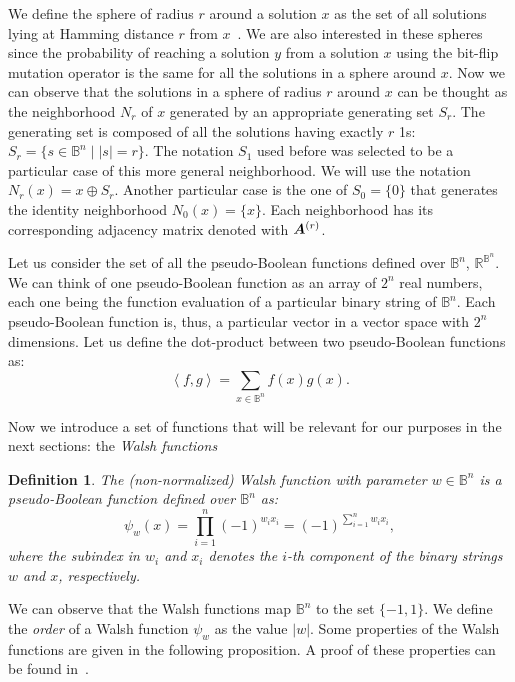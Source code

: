 \documentclass{article}
\newtheorem{definition}{Definition}
\def\vec#1{\mathchoice{\mbox{\boldmath$\displaystyle#1$}}
  {\mbox{\boldmath$\textstyle#1$}}
  {\mbox{\boldmath$\scriptstyle#1$}}
  {\mbox{\boldmath$\scriptscriptstyle#1$}}}
\newcommand{\Bo}[0]{\mathbb{B}}
\newcommand{\Real}[0]{\mathbb{R}}
\newcommand{\dotproduct}[2]{\left\langle #1,#2 \right\rangle}
\begin{document}
We define the sphere of radius $r$  around a solution $x$ as the set of all solutions lying at Hamming distance $r$ from $x$~\citep{Sutton2010}. We are also interested in these spheres since the probability of reaching a solution $y$ from a solution $x$ using the bit-flip mutation operator is the same for all the solutions in a sphere around $x$. Now we can observe that the solutions in a sphere of radius $r$ around $x$ can be thought as the neighborhood $N_r$ of $x$ generated by an appropriate generating set $S_r$. The generating set is composed of all the solutions having exactly $r$ 1s: $S_r=\{s \in \Bo^n \mid |s|=r\}$. The notation $S_1$ used before was selected to be a particular case of this more general neighborhood. We will use the notation $N_r(x)=x \oplus S_r$. Another particular case is the one of $S_0=\{0\}$ that generates the identity neighborhood $N_0(x)=\{x\}$. Each neighborhood has its corresponding adjacency matrix denoted with $\vec{A}^{(r)}$.



Let us consider the set of all the pseudo-Boolean functions defined over $\Bo^n$, $\Real^{\Bo^n}$. We can think of one pseudo-Boolean function as an array of $2^n$ real numbers, each one being the function evaluation of a particular binary string of $\Bo^n$. Each pseudo-Boolean function is, thus, a particular vector in a vector space with $2^n$ dimensions. Let us define the dot-product between two pseudo-Boolean functions as:
\begin{equation}
\dotproduct{f}{g} = \sum_{x \in \Bo^n} f(x) g(x).
\end{equation}

Now we introduce a set of functions that will be relevant for our purposes in the next sections: the \emph{Walsh functions}~\citep{Walsh1923}

\begin{definition}
The (non-normalized) Walsh function with parameter $w \in \Bo^n$ is a pseudo-Boolean function defined over $\Bo^n$ as:
\begin{equation}
\label{eqn:walsh-def}
\psi_{w}(x) = \prod_{i=1}^{n} (-1)^{w_i x_i} = (-1)^{\sum_{i=1}^n w_i x_i},
\end{equation}
where the subindex in $w_i$ and $x_i$ denotes the $i$-th component of the binary strings $w$ and $x$, respectively.
\end{definition}

We can observe that the Walsh functions map $\Bo^n$ to the set $\{-1,1\}$. We define the \emph{order} of a Walsh function $\psi_w$ as the value $|w|$. Some properties of the Walsh functions are given in the following proposition. A proof of these properties can be found in~\cite{Vose1999}.
\end{document}
